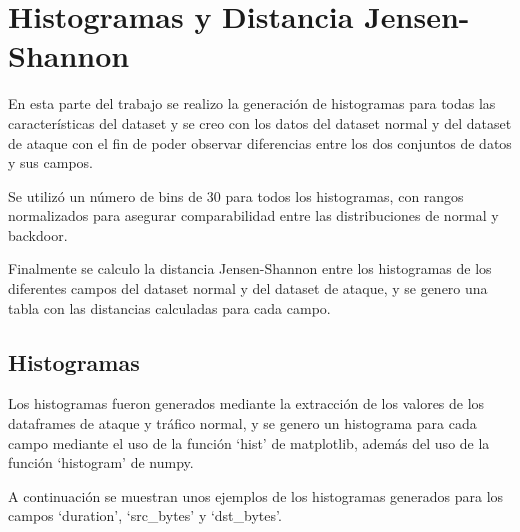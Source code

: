 \documentclass[12pt,a4paper]{article}
\begin{document}
\section{Histogramas y Distancia Jensen-Shannon}\label{sec:histogramas-y-distancia-jensen-shannon}

En esta parte del trabajo se realizo la generación de histogramas para todas las
características del dataset y se creo con los datos del dataset normal y
del dataset de ataque con el fin de poder observar diferencias entre los dos conjuntos de datos y sus campos.

Se utilizó un número de bins de 30 para todos los histogramas, con rangos normalizados
para asegurar comparabilidad entre las distribuciones de normal y backdoor.

Finalmente se calculo la distancia Jensen-Shannon entre los histogramas de los diferentes campos del dataset normal y del dataset de ataque,
y se genero una tabla con las distancias calculadas para cada campo.

\subsection{Histogramas}\label{subsec:histogramas}

Los histogramas fueron generados mediante la extracción de los valores de los dataframes de ataque y tráfico normal,
y se genero un histograma para cada campo mediante el uso de la función `hist' de matplotlib, además del uso
de la función `histogram' de numpy.

A continuación se muestran unos ejemplos de los histogramas generados para los campos `duration', `src_bytes' y `dst_bytes'.
\end{document}
